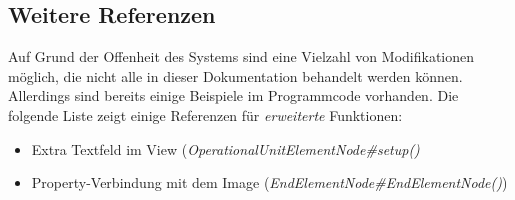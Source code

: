 \pagebreak
\subsection{Weitere Referenzen}
\label{code_extra_references}
Auf Grund der Offenheit des Systems sind eine Vielzahl von Modifikationen möglich, die nicht alle in dieser
Dokumentation behandelt werden können. Allerdings sind bereits einige Beispiele im Programmcode vorhanden.
Die folgende Liste zeigt einige Referenzen für \textit{erweiterte} Funktionen:

\begin{itemize}
	\item Extra Textfeld im View (\textit{OperationalUnitElementNode\#setup()}
	\item Property-Verbindung mit dem Image (\textit{EndElementNode\#EndElementNode()})
\end{itemize}
